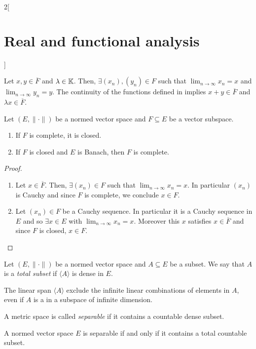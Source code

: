 \documentclass[../../../main_math.tex]{subfiles}
\begin{document}
\begin{multicols}{2}[\section{Real and functional analysis}]
\begin{proposition}
  \end{proposition}
  \begin{sproof}
    Let $x,y\in\overline{F}$ and $\lambda\in\mathbb{K}$. Then, $\exists(x_n),(y_n)\in F$ such that $\displaystyle \lim_{n\to\infty}x_n=x$ and $\displaystyle \lim_{n\to\infty}y_n=y$. The continuity of the functions defined in  implies $x+y\in\overline{F}$ and $\lambda x\in\overline{F}$.
  \end{sproof}
  \begin{proposition}
    Let $(E,\|\cdot\|)$ be a normed vector space and $F\subseteq E$ be a vector subspace.
    \begin{enumerate}
      \item If $F$ is complete, it is closed.
      \item If $F$ is closed and $E$ is Banach, then $F$ is complete.
    \end{enumerate}
  \end{proposition}
  \begin{proof}
    \begin{enumerate}
      \item Let $x\in\overline{F}$. Then, $\exists(x_n)\in F$ such that $\displaystyle \lim_{n\to\infty}x_n=x$. In particular $(x_n)$ is Cauchy and since $F$ is complete, we conclude $x\in F$.
      \item Let $(x_n)\in F$ be a Cauchy sequence. In particular it is a Cauchy sequence in $E$ and so $\exists x\in E$ with $\displaystyle \lim_{n\to\infty}x_n=x$. Moreover this $x$ satisfies $x\in \overline{F}$ and since $F$ is closed, $x\in F$.
    \end{enumerate}
  \end{proof}
  \begin{definition}
    Let $(E,\|\cdot\|)$ be a normed vector space and $A\subseteq E$ be a subset. We say that $A$ is a \emph{total subset} if $\langle A\rangle$ is dense in $E$.
  \end{definition}
  \begin{remark}
    The linear span $\langle A\rangle$ exclude the infinite linear combinations of elements in $A$, even if $A$ is a in a subspace of infinite dimension.
  \end{remark}
  \begin{definition}
    A metric space is called \emph{separable} if it contains a countable dense subset.
  \end{definition}
  \begin{proposition}
    A normed vector space $E$ is separable if and only if it contains a total countable subset.

\end{proposition}
\end{multicols}
\end{document}
